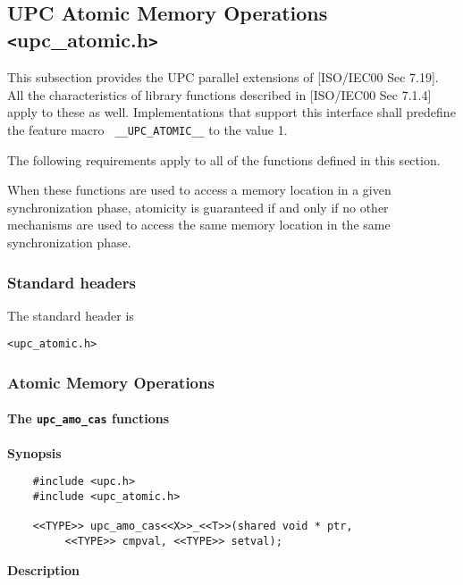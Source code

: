 \subsection{UPC Atomic Memory Operations \texttt{<}upc\_atomic.h\texttt{>}}

\npf This subsection provides the UPC parallel extensions of [ISO/IEC00 
    Sec 7.19].  All the characteristics of library functions described
    in [ISO/IEC00 Sec 7.1.4] apply to these as well.  Implementations
    that support this interface shall predefine the feature macro {\tt
    \_\_UPC\_ATOMIC\_\_} to the value 1.

\np The following requirements apply to all of the functions defined
    in this section.

\np When these functions are used to access a memory location in a given
    synchronization phase, atomicity is guaranteed if and only if no other
    mechanisms are used to access the same memory location in the same
    synchronization phase.

\subsubsection{Standard headers}

\np The standard header is

{\tt <upc\_atomic.h>}

\subsubsection{Atomic Memory Operations}

\paragraph{The {\tt upc\_amo\_cas} functions}

{\bf Synopsis} 

\npf\vspace{-2.5em}
\begin{verbatim}
    #include <upc.h>
    #include <upc_atomic.h>

    <<TYPE>> upc_amo_cas<<X>>_<<T>>(shared void * ptr,
         <<TYPE>> cmpval, <<TYPE>> setval);
\end{verbatim}

{\bf Description}

